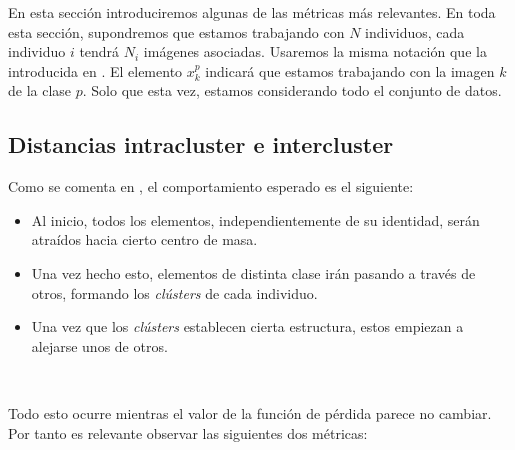 En esta sección introduciremos algunas de las métricas más relevantes. En toda esta sección, supondremos que estamos trabajando con $N$ individuos, cada individuo $i$ tendrá $N_i$ imágenes asociadas. Usaremos la misma notación que la introducida en . El elemento $x_k^p$ indicará que estamos trabajando con la imagen $k$ de la clase $p$. Solo que esta vez, estamos considerando todo el conjunto de datos.


\subsection{Distancias intracluster e intercluster} \label{isubs:teoria_distancia_intra_inter_cluster}

Como se comenta en \cite{informatica:paper_cacd}, el comportamiento esperado es el siguiente:

\begin{itemize}
    \item Al inicio, todos los elementos, independientemente de su identidad, serán atraídos hacia cierto centro de masa.
    \item Una vez hecho esto, elementos de distinta clase irán pasando a través de otros, formando los \textit{clústers} de cada individuo.
    \item Una vez que los \textit{clústers} establecen cierta estructura, estos empiezan a alejarse unos de otros.
\end{itemize}\

Todo esto ocurre mientras el valor de la función de pérdida parece no cambiar. Por tanto es relevante observar las siguientes dos métricas:


